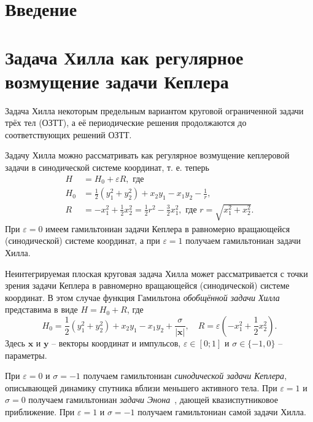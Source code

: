 \documentclass[14pt,a4paper%
]{extarticle}
\begin{document}
\section{Введение}\label{sec:intro}

\section{Задача Хилла как регулярное возмущение задачи Кеплера}
Задача Хилла некоторым предельным вариантом круговой ограниченной задачи трёх тел (ОЗТТ), а её периодические решения продолжаются до соответствующих решений ОЗТТ. 

Задачу Хилла можно рассматривать как регулярное возмущение кеплеровой задачи в синодической системе координат, т. е. теперь
\begin{equation}\label{eq:Keplerperturbed}
\begin{aligned}
H&=H_0+\varepsilon R,\text{ где }\\
H_0&=\frac12\left(y_1^2+y_2^2\right)+x_2y_1-x_1y_2-\frac{1}{r},\\
R&=-x_1^2+\frac12x_2^2=\frac12r^2-\frac32x_1^2,\text{ где }r=\sqrt{x_1^2+x_2^2}.
\end{aligned}
\end{equation}
При $\varepsilon=0$ имеем гамильтониан задачи Кеплера в равномерно вращающейся (синодической) системе координат, а при $\varepsilon=1$ получаем гамильтониан задачи Хилла.

Неинтегрируемая плоская круговая задача Хилла может рассматривается с точки зрения задачи Кеплера в равномерно вращающейся  (синодической) системе координат. В этом случае функция Гамильтона \textit{обобщённой задачи Хилла}~\cite{BatkhinDAN2014} представима в виде $H=H_0+R$, где
\begin{equation*}\label{Bat:HamGHP}
H_0=\frac12\left(y_1^2+y_2^2\right)+x_2y_1-x_1y_2+\frac{\sigma}{|\bm x|},\quad R=\varepsilon\left(-x_1^2+\frac12x_2^2\right).
\end{equation*}
Здесь $\bm x$ и $\bm y$ -- векторы координат и импульсов, $\varepsilon\in[0;1]$ и $\sigma\in\{-1,0\}$ -- параметры. 

При $\varepsilon=0$ и $\sigma=-1$ получаем гамильтониан \textit{синодической задачи Кеплера}, описывающей динамику спутника вблизи меньшего активного тела. При $\varepsilon=1$ и $\sigma=0$ получаем гамильтониан \textit{задачи Энона}~\cite[Гл.~3]{BatkhinsHill}, дающей квазиспутниковое приближение. При $\varepsilon=1$ и $\sigma=-1$ получаем гамильтониан самой задачи Хилла.
\end{document}
